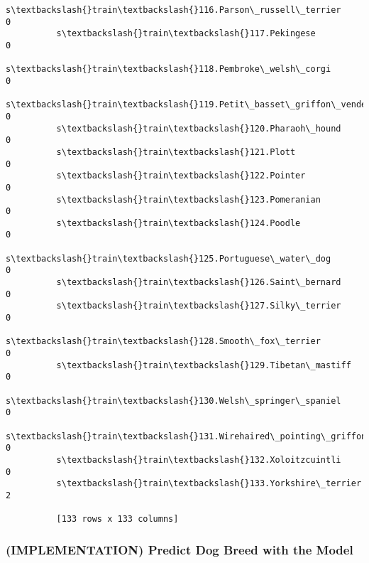 \documentclass[11pt]{article}
\begin{document}
\begin{Verbatim}[commandchars=\\\{\}]
          s\textbackslash{}train\textbackslash{}116.Parson\_russell\_terrier                                          0  
          s\textbackslash{}train\textbackslash{}117.Pekingese                                                       0  
          s\textbackslash{}train\textbackslash{}118.Pembroke\_welsh\_corgi                                            0  
          s\textbackslash{}train\textbackslash{}119.Petit\_basset\_griffon\_vendeen                                    0  
          s\textbackslash{}train\textbackslash{}120.Pharaoh\_hound                                                   0  
          s\textbackslash{}train\textbackslash{}121.Plott                                                           0  
          s\textbackslash{}train\textbackslash{}122.Pointer                                                         0  
          s\textbackslash{}train\textbackslash{}123.Pomeranian                                                      0  
          s\textbackslash{}train\textbackslash{}124.Poodle                                                          0  
          s\textbackslash{}train\textbackslash{}125.Portuguese\_water\_dog                                            0  
          s\textbackslash{}train\textbackslash{}126.Saint\_bernard                                                   0  
          s\textbackslash{}train\textbackslash{}127.Silky\_terrier                                                   0  
          s\textbackslash{}train\textbackslash{}128.Smooth\_fox\_terrier                                              0  
          s\textbackslash{}train\textbackslash{}129.Tibetan\_mastiff                                                 0  
          s\textbackslash{}train\textbackslash{}130.Welsh\_springer\_spaniel                                          0  
          s\textbackslash{}train\textbackslash{}131.Wirehaired\_pointing\_griffon                                     0  
          s\textbackslash{}train\textbackslash{}132.Xoloitzcuintli                                                  0  
          s\textbackslash{}train\textbackslash{}133.Yorkshire\_terrier                                               2  
          
          [133 rows x 133 columns]
\end{Verbatim}
            
    \subsubsection{(IMPLEMENTATION) Predict Dog Breed with the
Model}\label{implementation-predict-dog-breed-with-the-model}
\end{document}
